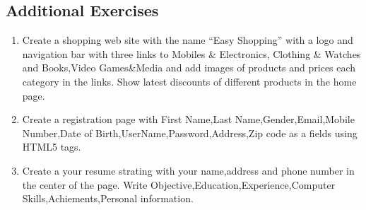 \documentclass[11pt,a4paper]{article}
\begin{document}
\subsection*{Additional Exercises}
\begin{enumerate}
\item Create a shopping web site with the name ``Easy Shopping'' with a logo and navigation bar with three links to Mobiles \& Electronics,  Clothing \& Watches and  Books,Video Games\&Media and add images of products and prices each category in the links.
Show latest discounts of different products in the home page.
\item Create a registration page with First Name,Last Name,Gender,Email,Mobile Number,Date of Birth,UserName,Password,Address,Zip code as a fields using HTML5 tags.
\item Create a your resume strating with your name,address and phone number in the center of the page. Write Objective,Education,Experience,Computer Skills,Achiements,Personal information.
\end{enumerate}
\end{document}
